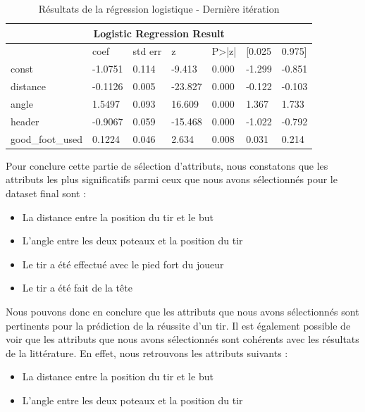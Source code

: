 \documentclass[12pt]{article}
\begin{document}
\begin{table}[htp]
    \centering
    \begin{tabular}{lllllll}
        \multicolumn{7}{c}{\textbf{Logistic Regression Result}}                                   \\ \hline
                         & coef    & std err & z       & P\textgreater{}|z| & {[}0.025 & 0.975{]} \\ \hline
        const            & -1.0751 & 0.114   & -9.413  & 0.000              & -1.299   & -0.851   \\
        distance         & -0.1126 & 0.005   & -23.827 & 0.000              & -0.122   & -0.103   \\
        angle            & 1.5497  & 0.093   & 16.609  & 0.000              & 1.367    & 1.733    \\
        header           & -0.9067 & 0.059   & -15.468 & 0.000              & -1.022   & -0.792   \\
        good\_foot\_used & 0.1224  & 0.046   & 2.634   & 0.008              & 0.031    & 0.214    \\ \hline
    \end{tabular}
    \caption{Résultats de la régression logistique - Dernière itération}
    \label{tab:logistic_regression_result_6}
\end{table}
\newpage
Pour conclure cette partie de sélection d'attributs, nous constatons que les attributs les plus significatifs parmi ceux que nous avons sélectionnés pour le dataset final sont :
\begin{itemize}
    \item La distance entre la position du tir et le but
    \item L'angle entre les deux poteaux et la position du tir
    \item Le tir a été effectué avec le pied fort du joueur
    \item Le tir a été fait de la tête
\end{itemize}
Nous pouvons donc en conclure que les attributs que nous avons sélectionnés sont pertinents pour la prédiction de la réussite d'un tir.
Il est également possible de voir que les attributs que nous avons sélectionnés sont cohérents avec les résultats de la littérature.
En effet, nous retrouvons les attributs suivants :
\begin{itemize}
    \item La distance entre la position du tir et le but
    \item L'angle entre les deux poteaux et la position du tir
\end{itemize}
\end{document}
